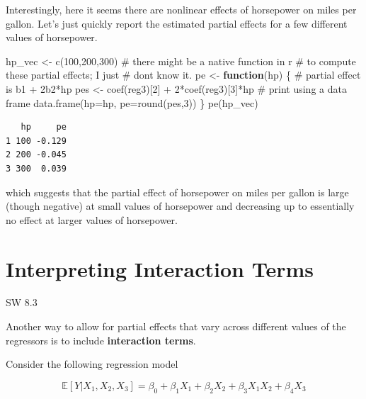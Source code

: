 \documentclass[
  letterpaper,
  DIV=11,
  numbers=noendperiod]{scrreprt}
\newenvironment{Shaded}{\begin{snugshade}}{\end{snugshade}}
\newcommand{\AttributeTok}[1]{\textcolor[rgb]{0.40,0.45,0.13}{#1}}
\newcommand{\CommentTok}[1]{\textcolor[rgb]{0.37,0.37,0.37}{#1}}
\newcommand{\ControlFlowTok}[1]{\textcolor[rgb]{0.00,0.23,0.31}{\textbf{#1}}}
\newcommand{\DecValTok}[1]{\textcolor[rgb]{0.68,0.00,0.00}{#1}}
\newcommand{\FunctionTok}[1]{\textcolor[rgb]{0.28,0.35,0.67}{#1}}
\newcommand{\NormalTok}[1]{\textcolor[rgb]{0.00,0.23,0.31}{#1}}
\newcommand{\OtherTok}[1]{\textcolor[rgb]{0.00,0.23,0.31}{#1}}
\newcommand{\SpecialCharTok}[1]{\textcolor[rgb]{0.37,0.37,0.37}{#1}}
\begin{document}
Interestingly, here it seems there are nonlinear effects of horsepower
on miles per gallon. Let's just quickly report the estimated partial
effects for a few different values of horsepower.

\begin{Shaded}
\begin{Highlighting}[]
\NormalTok{hp\_vec }\OtherTok{\textless{}{-}} \FunctionTok{c}\NormalTok{(}\DecValTok{100}\NormalTok{,}\DecValTok{200}\NormalTok{,}\DecValTok{300}\NormalTok{)}
\CommentTok{\# there might be a native function in r}
\CommentTok{\# to compute these partial effects; I just}
\CommentTok{\# don\textquotesingle{}t know it.}
\NormalTok{pe }\OtherTok{\textless{}{-}} \ControlFlowTok{function}\NormalTok{(hp) \{}
  \CommentTok{\# partial effect is b1 + 2b2*hp}
\NormalTok{  pes }\OtherTok{\textless{}{-}} \FunctionTok{coef}\NormalTok{(reg3)[}\DecValTok{2}\NormalTok{] }\SpecialCharTok{+} \DecValTok{2}\SpecialCharTok{*}\FunctionTok{coef}\NormalTok{(reg3)[}\DecValTok{3}\NormalTok{]}\SpecialCharTok{*}\NormalTok{hp}
  \CommentTok{\# print using a data frame}
  \FunctionTok{data.frame}\NormalTok{(}\AttributeTok{hp=}\NormalTok{hp, }\AttributeTok{pe=}\FunctionTok{round}\NormalTok{(pes,}\DecValTok{3}\NormalTok{))}
\NormalTok{\}}
\FunctionTok{pe}\NormalTok{(hp\_vec)}
\end{Highlighting}
\end{Shaded}

\begin{verbatim}
   hp     pe
1 100 -0.129
2 200 -0.045
3 300  0.039
\end{verbatim}

which suggests that the partial effect of horsepower on miles per gallon
is large (though negative) at small values of horsepower and decreasing
up to essentially no effect at larger values of horsepower.

\section{Interpreting Interaction
Terms}\label{interpreting-interaction-terms}

SW 8.3

Another way to allow for partial effects that vary across different
values of the regressors is to include \textbf{interaction terms}.

Consider the following regression model

\[
  \mathbb{E}[Y|X_1,X_2,X_3] = \beta_0 + \beta_1 X_1 + \beta_2 X_2 + \beta_3 X_1 X_2 + \beta_4 X_3
\]
\end{document}
